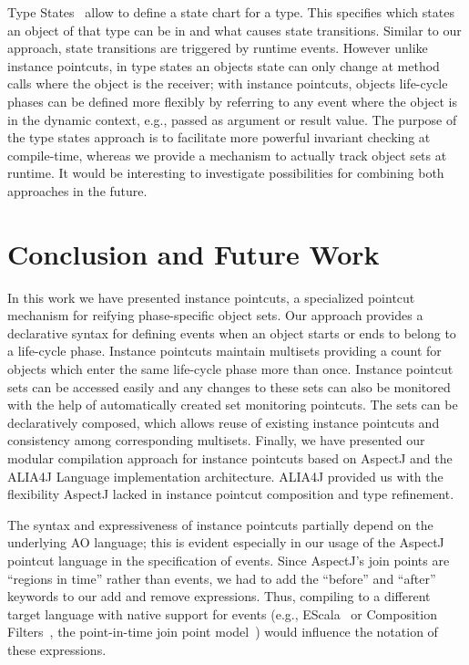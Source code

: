 \documentclass[10pt]{sigplanconf}
\begin{document}
Type States~\cite{DeLine2004} allow to define a state chart for a type.
This specifies which states an object of that type can be in and what causes state transitions.
Similar to our approach, state transitions are triggered by runtime events.
However unlike instance pointcuts, in type states an objects state can only change at method calls where the object is the receiver; with instance pointcuts, objects life-cycle phases can be defined more flexibly by referring to any event where the object is in the dynamic context, e.g., passed as argument or result value.
The purpose of the type states approach is to facilitate more powerful invariant checking at compile-time, whereas we provide a mechanism to actually track object sets at runtime.
It would be interesting to investigate possibilities for combining both approaches in the future.

\section{Conclusion and Future Work}
In this work we have presented instance pointcuts, a specialized pointcut mechanism for reifying phase-specific object sets.
Our approach provides a declarative syntax for defining events when an object starts or ends to belong to a life-cycle phase.
Instance pointcuts maintain multisets providing a count for objects which enter the same life-cycle phase more than once.
Instance pointcut sets can be accessed easily and any changes to these sets can also be monitored with the help of automatically created set monitoring pointcuts.
The sets can be declaratively composed, which allows reuse of existing instance pointcuts and consistency among corresponding multisets.
Finally, we have presented our modular compilation approach for instance pointcuts based on AspectJ and the ALIA4J Language implementation architecture.
ALIA4J provided us with the flexibility AspectJ lacked in instance pointcut composition and type refinement.

The syntax and expressiveness of instance pointcuts partially depend on the underlying AO language;
this is evident especially in our usage of the AspectJ pointcut language in the specification of events.
Since AspectJ's join points are ``regions in time'' rather than events, we had to add the ``before'' and ``after'' keywords to our add and remove expressions.
Thus, compiling to a different target language with native support for events (e.g., EScala~\cite{Gasiunas2011} or Composition Filters~\cite{Bergmans2001b}, the point-in-time join point model~\cite{masuharafine}) would influence the notation of these expressions.
\end{document}
